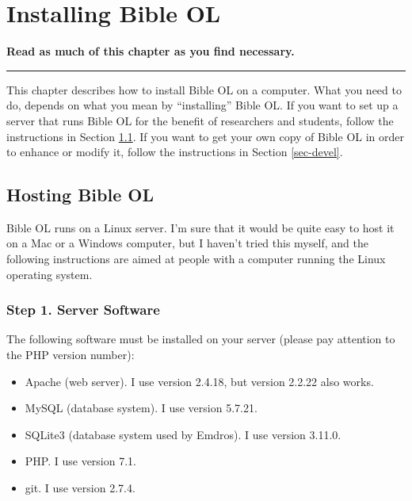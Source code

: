 \documentclass[11pt,oneside,a4paper]{memoir}
\begin{document}
\chapter{Installing Bible OL}\label{chap-install}

\textbf{Read as much of this chapter as you find necessary.}
\plainbreak{3}

This chapter describes how to install Bible OL on a computer. What you need to do, depends on what
you mean by ``installing'' Bible OL. If you want to set up a server that runs Bible OL for the
benefit of researchers and students, follow the instructions in Section \ref{sec-host}.
If you want to get your own copy of Bible OL in order to enhance or modify it, follow the
instructions in Section \ref{sec-devel}.


\section{Hosting Bible OL}\label{sec-host}

Bible OL runs on a Linux server. I'm sure that it would be quite easy to host it on a
Mac or a Windows computer, but I haven't tried this myself, and the
following instructions are aimed at people with a computer running the Linux operating system.

\subsection{Step 1. Server Software}

The following software must be installed on your server (please pay attention to the PHP version number):

\begin{itemize}
\item Apache (web server). I use version 2.4.18, but version 2.2.22 also works.
\item MySQL (database system). I use version 5.7.21.
\item SQLite3 (database system used by Emdros). I use version 3.11.0.
\item PHP. I use version 7.1.
\item git. I use version 2.7.4.
\end{itemize}
\end{document}
